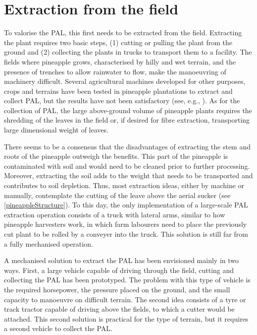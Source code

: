 \section{Extraction from the field}

To valorise the PAL, this first needs to be extracted from the field. Extracting the plant requires two basic steps, (1) cutting or pulling the plant from the ground and (2) collecting the plants in trucks to transport them to a facility. The fields where pineapple grows, characterised by hilly and wet terrain, and the presence of trenches to allow rainwater to flow, make the manoeuvring of machinery difficult. Several agricultural machines developed for other purposes, crops and terrains have been tested in pineapple plantations to extract and collect PAL, but the results have not been satisfactory (see, e.g., \cite{monniAnanas}). As for the collection of PAL, the large above-ground volume of pineapple plants requires the shredding of the leaves in the field or, if desired for fibre extraction, transporting large dimensional weight of leaves. 

There seems to be a consensus that the disadvantages of extracting the stem and roots of the pineapple outweigh the benefits. This part of the pineapple is contaminated with soil and would need to be cleaned prior to further processing. Moreover, extracting the soil adds to the weight that needs to be transported and contributes to soil depletion. Thus, most extraction ideas, either by machine or manually, contemplate the cutting of the leave above the aerial sucker (see \cref{pineappleStructure}). To this day, the only implementation of a large-scale PAL extraction operation consists of a truck with lateral arms, similar to how pineapple harvesters work, in which farm labourers need to place the previously cut plant to be rolled by a conveyer into the truck. This solution is still far from a fully mechanised operation.

A mechanised solution to extract the PAL has been envisioned mainly in two ways. First, a large vehicle capable of driving through the field, cutting and collecting the PAL has been prototyped. The problem with this type of vehicle is the required horsepower, the pressure placed on the ground, and the small capacity to manoeuvre on difficult terrain. The second idea consists of a tyre or track tractor capable of driving above the fields, to which a cutter would be attached. This second solution is practical for the type of terrain, but it requires a second vehicle to collect the PAL.

